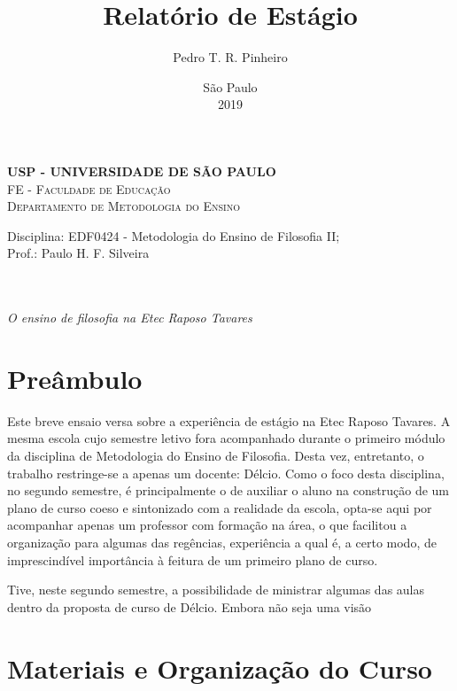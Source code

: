\documentclass[12pt,a4paper]{article}
\author{Pedro T. R. Pinheiro}
\date{São Paulo\\2019}
\title{Relatório de Estágio}
\newcommand{\subtitulo}{O ensino de filosofia na Etec Raposo Tavares}
\newcommand{\disciplina}{EDF0424 - Metodologia do Ensino de Filosofia II}
\newcommand{\departamento}{Departamento de Metodologia do Ensino}
\newcommand{\unidade}{FE - Faculdade de Educação}
\newcommand{\prof}{Paulo H. F. Silveira}
\begin{document}
	\begin{center}
				\textbf{
				\LARGE USP - UNIVERSIDADE DE SÃO PAULO \\
			}
			\Large \textsc{\unidade} \\
			\large \textsc{\departamento}\\
			\vspace*{1cm}
				
			Disciplina: \disciplina; \\Prof.: \prof
			\vfill
			\begin{center}
				{\Large \textsc{\theauthor}} \\ 
				\vspace{1cm}
				\LARGE\textbf{\thetitle} \\
				\Large\emph{\subtitulo}
			\end{center}
			\vfill
			\large\thedate
			\vspace*{1cm}
			\thispagestyle{empty}			
	\end{center}

	\newpage

	\setlength{\parskip}{0.5cm}
	\setlength{\parindent}{1.1cm}
	\onehalfspacing
	
	\section*{Preâmbulo}
	
	Este breve ensaio versa sobre a experiência de estágio na Etec Raposo 
	Tavares. A mesma escola cujo semestre letivo fora acompanhado durante 
	o primeiro módulo da disciplina de Metodologia do Ensino de Filosofia. 
	Desta vez, entretanto, o trabalho restringe-se a apenas um docente: Délcio. 
	Como o foco desta disciplina, no segundo semestre, é principalmente o de 
	auxiliar o aluno na construção de um plano de curso coeso e sintonizado 
	com a  realidade da escola, opta-se aqui por acompanhar apenas um professor 
	com formação na área, o que facilitou a organização para algumas das 
	regências, experiência a qual é, a certo modo, de imprescindível importância 
	à feitura de um primeiro plano de curso. 
	
	Tive, neste segundo semestre, a possibilidade de ministrar algumas das 
	aulas dentro da proposta de curso de Délcio. Embora não seja uma visão 
	
	
	
	
	
	\newpage
	
	\section{Materiais e Organização do Curso}
	
\end{document}
